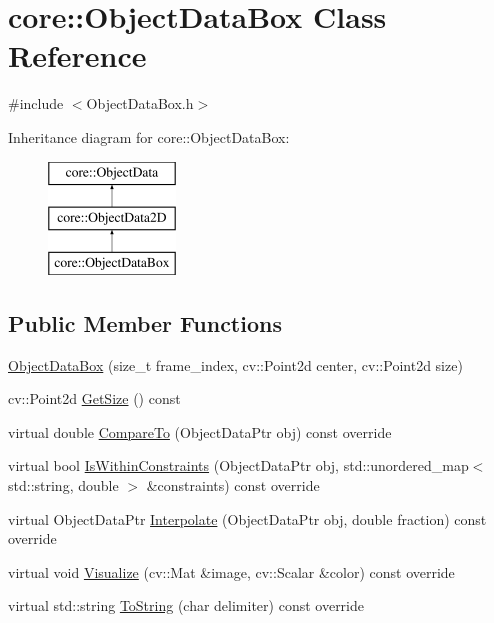 \hypertarget{classcore_1_1ObjectDataBox}{}\section{core\+:\+:Object\+Data\+Box Class Reference}
\label{classcore_1_1ObjectDataBox}


{\ttfamily \#include $<$Object\+Data\+Box.\+h$>$}

Inheritance diagram for core\+:\+:Object\+Data\+Box\+:\begin{figure}[H]
\begin{center}
\leavevmode
\includegraphics[height=3.000000cm]{classcore_1_1ObjectDataBox}
\end{center}
\end{figure}
\subsection*{Public Member Functions}
\begin{DoxyCompactItemize}
\item 
\hyperlink{classcore_1_1ObjectDataBox_a4e331870ed012d9bc44bc769aee86362}{Object\+Data\+Box} (size\+\_\+t frame\+\_\+index, cv\+::\+Point2d center, cv\+::\+Point2d size)
\item 
cv\+::\+Point2d \hyperlink{classcore_1_1ObjectDataBox_a76e9f48dfb685d16de868a129c1f3918}{Get\+Size} () const
\item 
virtual double \hyperlink{classcore_1_1ObjectDataBox_a163c57338778f957ce514611c509558a}{Compare\+To} (Object\+Data\+Ptr obj) const override
\item 
virtual bool \hyperlink{classcore_1_1ObjectDataBox_a04f4b780b79491270e4838f7504c1917}{Is\+Within\+Constraints} (Object\+Data\+Ptr obj, std\+::unordered\+\_\+map$<$ std\+::string, double $>$ \&constraints) const override
\item 
virtual Object\+Data\+Ptr \hyperlink{classcore_1_1ObjectDataBox_ab2816bceb771dd7442e6c29193dfe267}{Interpolate} (Object\+Data\+Ptr obj, double fraction) const override
\item 
virtual void \hyperlink{classcore_1_1ObjectDataBox_ab29bacb20c258ba572d0372469ec5523}{Visualize} (cv\+::\+Mat \&image, cv\+::\+Scalar \&color) const override
\item 
virtual std\+::string \hyperlink{classcore_1_1ObjectDataBox_a0af10953ccecb7089a3a2841ec7419b9}{To\+String} (char delimiter) const override
\end{DoxyCompactItemize}


